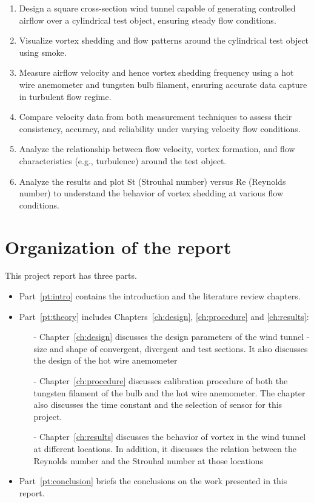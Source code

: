 \begin{enumerate}

\item Design a square cross-section wind tunnel capable of generating controlled airflow over a cylindrical test object, ensuring steady flow conditions.

\item Visualize vortex shedding and flow patterns around the cylindrical test object using smoke.

\item Measure airflow velocity and hence vortex shedding frequency using a hot wire anemometer and tungsten bulb filament, ensuring accurate data capture in turbulent flow regime.

\item Compare velocity data from both measurement techniques to assess their consistency, accuracy, and reliability under varying velocity flow conditions.

\item Analyze the relationship between flow velocity, vortex formation, and flow characteristics (e.g., turbulence) around the test object.

\item Analyze the results and plot St (Strouhal number) versus Re (Reynolds number) to understand the behavior of vortex shedding at various flow conditions.

\end{enumerate}

\section{Organization of the report}
This project report has three parts.
\begin{itemize}
\item Part~\ref{pt:intro} contains the introduction and the literature review chapters.
\item Part~\ref{pt:theory} includes Chapters~\ref{ch:design}, \ref{ch:procedure} and \ref{ch:results}:
	\begin{enumerate}
	\item[-] Chapter~\ref{ch:design} discusses the design parameters of the wind tunnel - size and shape of convergent, divergent and test sections. It also discusses the design of the hot wire anemometer
	\item[-] Chapter~\ref{ch:procedure} discusses calibration procedure of both the tungsten filament of the bulb and the hot wire anemometer. The chapter also discusses the time constant and the selection of sensor for this project.
    \item[-] Chapter~\ref{ch:results} discusses the behavior of vortex in the wind tunnel at different locations. In addition, it discusses the relation between the Reynolds number and the Strouhal number at those locations
    \end{enumerate}
\item Part~\ref{pt:conclusion} briefs the conclusions on the work presented in this report.
\end{itemize}






